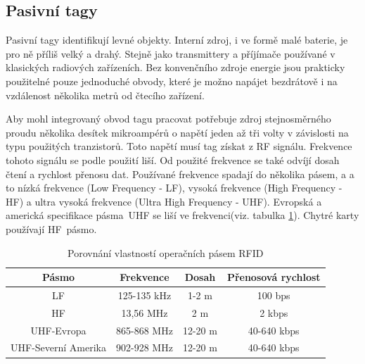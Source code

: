 \subsection{Pasivní tagy}
\label{pasivniTagy}
Pasivní tagy identifikují levné objekty. Interní zdroj, i ve formě malé baterie, je pro ně příliš velký a drahý. Stejně jako transmittery a příjímače používané v klasických radiových zařízeních. Bez konvenčního zdroje energie jsou prakticky použitelné pouze jednoduché obvody, které je možno napájet bezdrátově i na vzdálenost několika metrů od čtecího zařízení. 
\par 
Aby mohl integrovaný obvod tagu pracovat potřebuje zdroj stejnosměrného proudu několika desítek mikroampérů o napětí  jeden až tři volty v závislosti na typu použitých tranzistorů. Toto napětí musí tag získat z RF signálu\cite{The_RF_in_RFID}. Frekvence tohoto signálu se podle použití liší. Od použité frekvence se také odvíjí dosah čtení a rychlost přenosu dat. Používané frekvence spadají do několika pásem, a a to nízká frekvence ({Low Frequency - LF}), vysoká frekvence ({High Frequency - HF}) a ultra vysoká frekvence ({Ultra High Frequency - UHF}). Evropská a americká specifikace pásma~UHF se liší ve frekvenci(viz. tabulka \ref{tabulka_pasem}). Chytré karty používají HF~pásmo\cite{Smart_Cards_Tokens_Security}. \par
\begin{table}[]
\begin{tabular}{cccc}
\hline
Pásmo               & Frekvence   & Dosah   & Přenosová rychlost \\ \hline
LF                  & 125-135 kHz & 1-2 m   & 100 bps            \\
HF                  & 13,56 MHz   & 2 m     & 2 kbps             \\
UHF-Evropa          & 865-868 MHz & 12-20 m & 40-640 kbps        \\
UHF-Severní Amerika & 902-928 MHz & 12-20 m & 40-640 kbps        \\ \hline
\end{tabular}
\caption{Porovnání vlastností operačních pásem RFID\cite{RFID_explained}\cite{The_RF_in_RFID}}
\label{tabulka_pasem}
\end{table}

